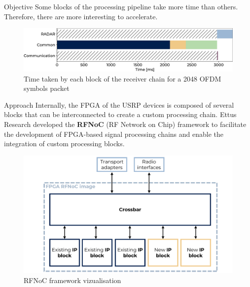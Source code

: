\documentclass[final]{beamer}
\newlength{\onecolwid}
\begin{document}
\begin{frame}[t,fragile]
\begin{columns}[t]
\begin{column}{\onecolwid}
\begin{block}{Objective}
    Some blocks of the processing pipeline take more time than others. Therefore, there are more interesting to accelerate.

    \vspace{0.2in}

    \begin{figure}[!ht]
      \centering
      \includegraphics[width=\linewidth]{../../experiments/01/complexity.png}
      \caption{Time taken by each block of the receiver chain for a 2048 OFDM symbols packet}
    \end{figure}

  \end{block}


  \begin{block}{Approach}
    Internally, the FPGA of the USRP devices is composed of several blocks that can be interconnected to create a custom processing chain. 
    Ettus Research developed the \textbf{RFNoC} (RF Network on Chip) framework to facilitate the development of FPGA-based signal processing chains and enable the integration of custom processing blocks.

    \begin{figure}[!ht]
      \centering
      \includegraphics[width=\linewidth]{img/RFNoC.pdf}
      \caption{RFNoC framework vizualisation}
    \end{figure}

  \end{block}
\end{column}



\end{columns}
\end{frame}
\end{document}
